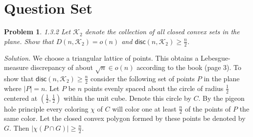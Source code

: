 \documentclass[11pt]{article}
\def\R{\mathbb{R}}
\newcommand\A{\mathcal{A}}
\newcommand\disc{\mathsf{disc}}
\newcommand\K{\mathcal{K}}
\newtheorem{problem}{Problem}
\begin{document}
\rhead{\today}

\section*{Question Set}

\begin{comment}
\begin{problem}
1.3.1 Prove: that if $D(n, \A) = o(n)$ and $D(n, \A) \geq f(n)$ for all $n$, with $\A$ a class of Lebesgue-measure sets in $\R^d$ containing a set $A_0$ with $[0,1]^d \subseteq A_0$ and $f$ satisfying $f(2n) \leq (2-\delta)f(n)$ for some fix $\delta > 0$, then $\disc(n, \A) \geq cf(n)$ holds for infinitely many $n$ with a suitable constant $c = c(\delta) > 0$.
\end{problem}
\begin{proof}

\end{proof}
\end{comment}


\begin{problem}
1.3.2 Let $\K_2$ denote the collection of all closed convex sets in the plane. Show that $D(n, \K_2) = o(n)$ and $\disc(n, \K_2) \geq \frac{n}{2}$.
\end{problem}
\emph{Solution.}
We choose a triangular lattice of points. This obtains a Lebesgue-measure discrepancy of about $\sqrt{n} \in o(n)$ according to the book (page 3). To show that $\disc(n, \K_2) \geq \frac{n}{2}$ consider the following set of points $P$ in the plane where $|P| = n$. Let $P$ be $n$ points evenly spaced about the circle of radius $\frac{1}{2}$ centered at $\left( \frac{1}{2}, \frac{1}{2} \right)$ within the unit cube. Denote this circle by $C$. By the pigeon hole principle every coloring $\chi$ of $C$ will color one at least $\frac{n}{2}$ of the points of $P$ the same color. Let the closed convex polygon formed by these points be denoted by $G$. Then $|\chi(P \cap G)| \geq \frac{n}{2}$.

\begin{comment}
\begin{problem}
\textcolor{blue}{
1.3.3 Find a class $\A$ of measurable sets in the plane such that $D(n, \A) = \Omega(n)$.}
\end{problem}
\emph{Solution.}
\end{comment}
\end{document}
